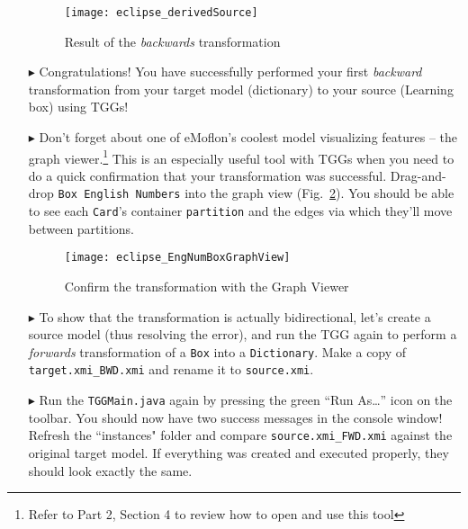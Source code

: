 \begin{itemize}
\vspace{0.5cm}

\begin{figure}[htbp]
\begin{center}
  \texttt{[image: eclipse\_derivedSource]}
  \caption{Result of the \emph{backwards} transformation}
  \label{eclipse:derivedBOX}
\end{center}
\end{figure}

\item[$\blacktriangleright$] Congratulations! You have successfully performed your first \emph{backward} transformation from your target model (dictionary) to
your source (Learning box) using TGGs! 

\newpage

\item[$\blacktriangleright$] Don't forget about one of eMoflon's coolest model visualizing features -- the graph viewer.\footnote{Refer to Part 2, Section 4 to
review how to open and use this tool} This is an especially useful tool with TGGs when you need to do a quick confirmation that your transformation was
successful. Drag-and-drop \texttt{Box English Numbers} into the graph view (Fig.~\ref{eclipse:graphView}). You should be able to see each \texttt{Card}'s
container \texttt{partition} and the edges via which they'll move between partitions. 

\vspace{0.5cm}

\begin{figure}[htb]
\begin{center}
  \texttt{[image: eclipse\_EngNumBoxGraphView]}
  \caption{Confirm the transformation with the Graph Viewer}
  \label{eclipse:graphView}
\end{center}
\end{figure}

\vspace{0.5cm}

\item[$\blacktriangleright$] To show that the transformation is actually bidirectional, let's create a source model (thus resolving the error), and run
the TGG again to perform a \emph{forwards} transformation of a \texttt{Box} into a \texttt{Dictionary}. Make a copy of \texttt{target.xmi\_BWD.xmi} and rename
it to \texttt{source.xmi}.

\newpage

\item[$\blacktriangleright$] Run the \texttt{TGGMain.java} again by pressing the green ``Run As\ldots'' icon on the toolbar. You should now have two success
messages in the console window! Refresh the ``instances" folder and compare \texttt{source.xmi\_FWD.xmi} against the original target model. If everything was
created and executed properly, they should look exactly the same. 

\end{itemize}
